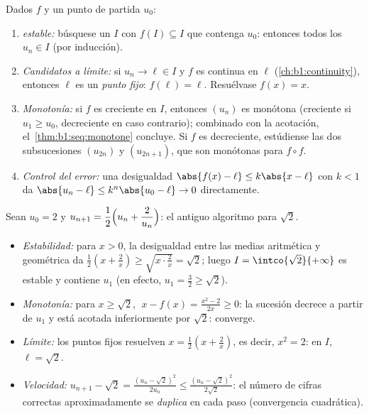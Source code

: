 \begin{method}[Estudiar $u_{n+1} = f(u_n)$]\label{met:b1:seq:recurrent}
Dados $f$ y un punto de partida $u_0$:
\begin{enumerate}
  \item \emph{ estable:} búsquese un  $I$ con
        $f(I) \subseteq I$ que contenga $u_0$: entonces todos los
        $u_n \in I$ (por inducción).
  \item \emph{Candidatos a límite:} si $u_n \to \ell \in I$ y $f$ es
        continua en $\ell$ (\cref{ch:b1:continuity}), entonces $\ell$
        es un \emph{punto fijo}: $f(\ell) = \ell$. Resuélvase
        $f(x) = x$.
  \item \emph{Monotonía:} si $f$ es creciente en $I$, entonces
        $(u_n)$ es monótona (creciente si $u_1 \geq u_0$, decreciente
        en caso contrario); combinado con la acotación,
        el~\cref{thm:b1:seq:monotone} concluye. Si $f$ es decreciente,
        estúdiense las dos subsucesiones $(u_{2n})$ y $(u_{2n+1})$,
        que son monótonas para $f \circ f$.
  \item \emph{Control del error:} una desigualdad
        $\abs{f(x) - \ell} \leq k\abs{x - \ell}$ con $k < 1$ da
        $\abs{u_n - \ell} \leq k^n \abs{u_0 - \ell} \to 0$ directamente.
\end{enumerate}
\end{method}

\begin{example}\label{ex:b1:seq:heron}
Sean $u_0 = 2$ y $u_{n+1} = \dfrac12\Bigl(u_n + \dfrac{2}{u_n}\Bigr)$:
el antiguo algoritmo para
$\sqrt 2$.
\begin{itemize}
  \item \emph{Estabilidad:} para $x > 0$, la desigualdad entre las
        medias aritmética y geométrica da $\frac12(x + \frac2x) \geq
        \sqrt{x \cdot \frac 2x} = \sqrt 2$; luego
        $I = \intco{\sqrt 2}{+\infty}$ es estable y contiene $u_1$ (en
        efecto, $u_1 = \frac32 \geq \sqrt 2$).
  \item \emph{Monotonía:} para $x \geq \sqrt 2$, $\;x - f(x) =
        \frac{x^2 - 2}{2x} \geq 0$: la sucesión decrece a partir de
        $u_1$ y está acotada inferiormente por $\sqrt 2$: converge.
  \item \emph{Límite:} los puntos fijos resuelven $x = \frac12(x +
        \frac2x)$, es decir, $x^2 = 2$: en $I$, $\ell = \sqrt 2$.
  \item \emph{Velocidad:} $u_{n+1} - \sqrt 2 = \frac{(u_n -
        \sqrt2)^2}{2u_n} \leq \frac{(u_n - \sqrt 2)^2}{2\sqrt 2}$: el
        número de cifras correctas aproximadamente se \emph{duplica}
        en cada paso (convergencia cuadrática).
\end{itemize}
\end{example}

